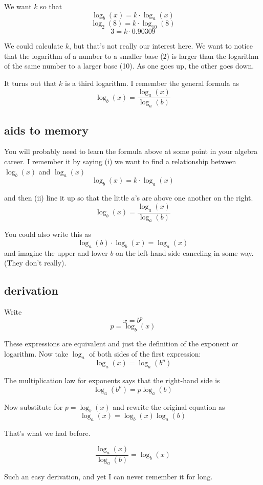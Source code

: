 \documentclass[11pt, oneside]{article}
\begin{document}
We want $k$ so that
\[ \log_b (x) = k \cdot \log_a (x) \]
\[ \log_2 (8) = k \cdot \log_{10} (8) \]
\[ 3 = k \cdot 0.90309 \]

We could calculate $k$, but that's not really our interest here.  We want to notice that the logarithm of a number to a smaller base ($2$) is larger than the logarithm of the same number to a larger base (10).  As one goes up, the other goes down.

It turns out that $k$ is a third logarithm.  I remember the general formula as
\[ \log_b (x) = \frac{\log_a (x)}{\log_a (b)} \]

\subsection*{aids to memory}

You will probably need to learn the formula above at some point in your algebra career.  I remember it by saying (i) we want to find a relationship between $\log_b (x)$ and $\log_a (x)$ 
\[ \log_b (x) = k \cdot \log_a (x) \]

and then (ii) line it up so that the little $a$'s are above one another on the right.
\[ \log_b (x) = \frac{\log_a (x)}{\log_a (b)} \]

You could also write this as
\[ \log_a (b) \cdot \log_b (x) = \log_a (x) \]
and imagine the upper and lower $b$ on the left-hand side canceling in some way.  (They don't really).

\subsection*{derivation}

Write
\[ x = b^p \]
\[ p = \log_b (x) \]

These expressions are equivalent and just the definition of the exponent or logarithm.  Now take $\log_a$ of both sides of the first expression:
\[ \log_a (x) = \log_a (b^p) \]

The multiplication law for exponents says that the right-hand side is
\[ \log_a (b^p) = p \log_a (b) \]

Now substitute for $p = \log_b (x)$ and rewrite the original equation as
\[ \log_a (x) = \log_b (x)  \log_a (b) \]

That's what we had before.

\[ \frac{\log_a(x)}{\log_a(b)} = \log_b(x) \]

Such an easy derivation, and yet I can never remember it for long.
\end{document}

